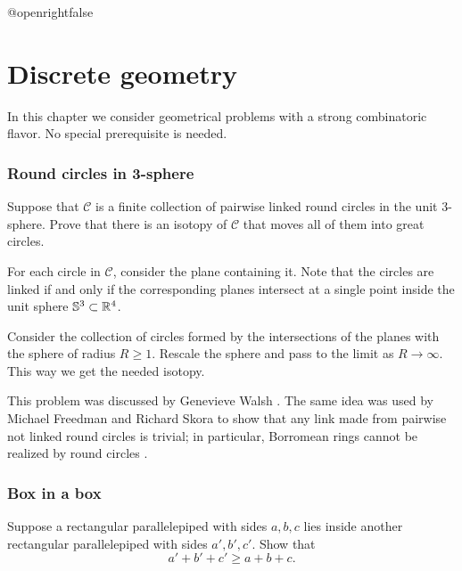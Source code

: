 \csname @openrightfalse\endcsname
\chapter{Discrete geometry}

In this chapter we consider geometrical problems with a strong combinatoric flavor.
No special prerequisite is needed.

\subsection*{Round circles in 3-sphere}\label{Round circles}

\begin{pr}
Suppose that $\mathcal{C}$ is a finite collection of pairwise linked round circles in the unit 3-sphere. 
Prove that there is an isotopy of $\mathcal{C}$ that moves all of them into great circles.
\end{pr}


For each circle in $\mathcal{C}$, consider the plane containing it.
Note that the circles are linked 
if and only if 
the corresponding planes intersect at a single point inside the unit sphere $\mathbb{S}^3\subset \mathbb{R}^4$.

Consider the collection of circles formed by the intersections of the planes with the sphere of radius $R\ge 1$.
Rescale the sphere and pass to the limit as $R\to\infty$.  
This way we get the needed isotopy.\qeds

This problem was discussed 
by Genevieve Walsh \cite{walsh}.
The same idea was used by Michael Freedman and  Richard Skora to show that any link made from pairwise not linked round circles is trivial; 
in particular, Borromean rings cannot be realized by round circles
\cite[see Lemma 3.2 in ][]{freedman-skora}.

\subsection*{Box in a box}\label{box-in-box}

\begin{pr}
Suppose a rectangular parallelepiped with sides $a,b,c$ 
lies inside another rectangular parallelepiped with sides $a',b',c'$. 
Show that 
\[a'+b'+c'\ge a+b+c.\]

\end{pr}

